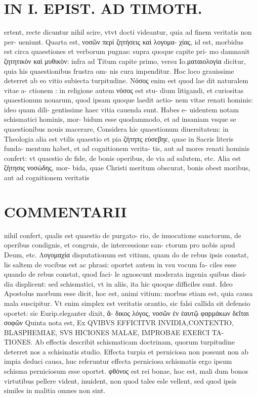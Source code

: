 \documentclass{article}
\begin{document}
\begin{pages}
\section*{IN I. EPIST. AD TIMOTH. }\pstart ertent, recte dicuntur nihil scire, vtvt docti videantur, quia ad finem veritatis non per- ueniunt.  \pend\pstart Quarta est, νοσῶν περί ζητήσεις καὶ λογομα- χίας, id est, morbidus est circa quaestiones et verborum pugnas: supra quoque capite pri- mo damnauit ζητητικόν καὶ μυθικὸν: infra ad Titum capite primo, versu Io.ματαιολογία dicitur, quia his quaestionibus frustra om- nis cura impenditur. Hoc loco grauissime deterret ab eo vitio subiecta turpitudine. Νόσος  enim est quod lae dit naturalem vitae a- ctionem : in religione autem νόσος est stu- dium litigandi, et curiositas quaestionum nouarum, quod ipsam quoque laedit actio- nem vitae renati hominis: ideo quam dili- gentissime haec vitia cauenda sunt. Habes e- uidentem notam schismatici hominis, mor- bidum esse quodammodo, et ad insaniam vsque se quaestionibus nouis macerare, Considera hic quaestionum diuersitatem: in Theologia alia est vtilis quaestio et pia ζήτηπς εὐσεβηε, quae in Sacris literis funda- mentum habet, et ad cognitionem verita- tis, aut ad mores renati hominis confert: vt quaestio de fide, de bonis operibus, de via ad salutem, etc. Alia est ζήτησις νοσώδης, mor- bida, quae Christi meritum obscurat, bonis obest moribus, aut ad cognitionem veritatis  \pend
\marginpar{[ p.151 ]}
\marginpar{[ p.152 ]}
\section*{COMMENTARII }\pstart nihil confert, qualis est quaestio de purgato- rio, de inuocatione sanctorum, de operibus condignis, et congruis, de intercessione san- ctorum pro nobis apud Deum, etc.  \pend\pstart Λογομαχία disputationum est vitium, quam do de rebus ipsis constat, lis saltem de vocibus est ac phrasi: oportet autem in vsu vocum fa- ciles esse quando de rebus constat, quod faci- le agnoscunt moderata ingenia quibus dissi- dia displicent: sed schismatici, vt in aliis, ita hic quoque difficiles sunt. Ideo Apostolus morbum esse dicit, hoc est, animi vitium: morbus etiam est, quia causa mala suscipitur. Vt enim simplex est veritatis orantio, sic falsi callida sit defensio oportet: sic Eurip.eleganter dixit, ἄ- δικος λόγος, νοσῶν ἐν ἑαυτῷ φαρμάκων δεῖται σοφῶν  \pend\pstart Quinta nota est, Ex QVIBVS EFFICITVR INVIDIA,CONTENTIO, BLASPHEMIAE, SVS HICIONES MALAE, IMPROBAE EXERCI TA- TIONES. Ab effectis describit schismaticam doctrinam, quorum turpitudine deterret nos a schisinatis studio. Effecta turpia et perniciosa non possunt non ab impia deduci causa, huc referuntur effecta perniciosa schismatis ergo ipsum schisma perniciosum esse oportet. φθόνος est rei bonae, hoc est, mali dum bonos virtutibus pellere vident, inuident, non quod tales esle vellent, sed quod ipsis similes in malitia omnes non sint.  \pend

\end{pages}
\end{document}
